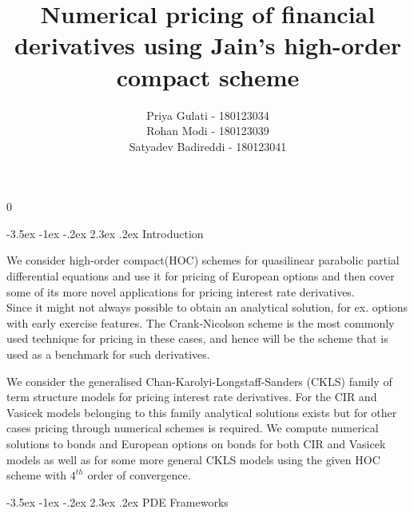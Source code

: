 \documentclass[11pt]{article}
\makeatletter
\newcommand{\blind}{0}
\renewcommand\section{\@startsection {section}{1}{\z@}%
                                       {-3.5ex \@plus -1ex \@minus -.2ex}%
                                       {2.3ex \@plus.2ex}%
                                       {\normalfont\fontfamily{phv}\fontsize{16}{19}\bfseries}}
\makeatother
\begin{document}
	
	
		
		\def\spacingset#1{\renewcommand{\baselinestretch}%
			{#1}\small\normalsize} \spacingset{1}
		
		\blind
		{
			\title{\bf {Numerical pricing of financial derivatives using
Jain’s high-order compact scheme}}
			\author{Priya Gulati - 180123034 \\ Rohan Modi - 180123039 \\
			Satyadev Badireddi - 180123041}
			\date{}
			\maketitle
		} \fi
		
		
		

			


	\spacingset{1.5} %



\section{Introduction}

We consider high-order compact(HOC) schemes for quasilinear parabolic partial differential equations and use it for pricing of European options and then cover some of its more novel applications for pricing interest rate derivatives. \\
Since it might not always possible to obtain an analytical solution, for ex. options with early exercise features. The Crank-Nicolson scheme is the most commonly used technique for pricing in these cases, and hence will be the scheme that is used as a benchmark for such derivatives.

We consider the generalised Chan-Karolyi-Longstaff-Sanders (CKLS) family of term structure models for pricing interest rate derivatives. For the CIR and Vasicek models belonging to this family analytical solutions exists but for other cases pricing through numerical schemes is required. We compute numerical solutions to bonds and European options on bonds for both CIR and Vasicek models as well as for some more general CKLS models using the given HOC scheme with $4^{th}$ order of convergence.


\section{PDE Frameworks}
\end{document}
